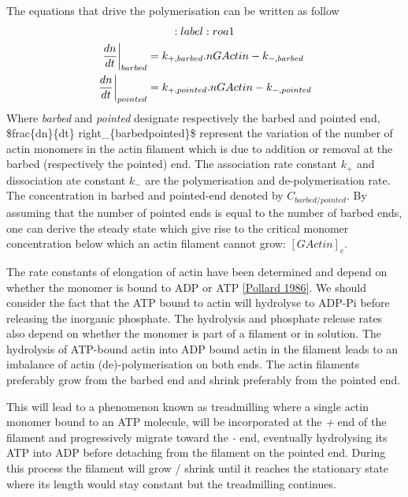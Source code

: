 \documentclass[A4paperpaper,11pt,english]{sphinxmanual}
\begin{document}
The equations that drive the polymerisation can be written as follow
\begin{gather}
\begin{split}:label: roa1\end{split}\notag\\\begin{split}\left. \frac{dn}{dt} \right|_{barbed}&= k_{+,{barbed}}.nGActin - k_{-,{barbed}} \\
\left. \frac{dn}{dt}\right|_{pointed}&= k_{+,{pointed}}.nGActin - k_{-,{pointed}} \\\end{split}\notag
\end{gather}
Where \emph{barbed} and \emph{pointed} designate respectively the barbed and pointed end,
\$frac\{dn\}\{dt\} right\textbar{}\_\{barbed\textbar{}pointed\}\$ represent the variation of the number of actin
monomers in the actin filament which is due to addition or removal at the barbed
(respectively the pointed) end.
The association rate constant \(k_+\) and dissociation ate constant \(k_-\) are the polymerisation and de-polymerisation
rate.  The concentration in barbed and pointed-end denoted by
\(C_{{barbed}/{pointed}}\). By assuming that the number of pointed ends is
equal to the number of barbed ends, one can derive the steady state which give
rise to the critical monomer concentration below which an actin filament cannot
grow: \([GActin]_c\).

The rate constants of elongation of actin have been determined and depend on
whether the monomer is bound to ADP or ATP {\hyperref[index-latex:pollard1986]{{[}Pollard  1986{]}}}. We should
consider the fact that the  ATP bound to actin will hydrolyse to ADP-Pi before releasing
the inorganic phosphate. The hydrolysis and phosphate release rates also depend on whether the
monomer is part of a filament or in solution. The hydrolysis of ATP-bound
actin into ADP bound actin in the filament  leads to an imbalance of actin
(de)-polymerisation on both ends. The actin filaments preferably
grow from the barbed end and shrink preferably from the pointed end.

This will lead to a phenomenon known as treadmilling where a single actin
monomer bound to an ATP molecule, will be incorporated at the \emph{+} end of the
filament and progressively migrate toward the \emph{-} end, eventually hydrolysing its
ATP into ADP before detaching from the filament on the pointed end. During this
process the filament will grow / shrink until it reaches the stationary state
where its length would stay constant but the treadmilling continues.
\end{document}
